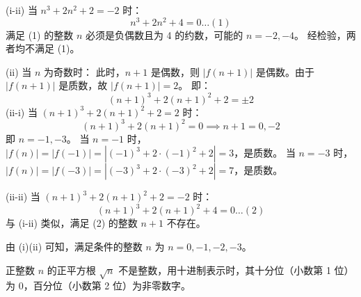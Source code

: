 \begin{questions}
\begin{solution}
    (i-ii) 当 $n^3 + 2n^2 + 2 = -2$ 时：
    \[
    n^3 + 2n^2 + 4 = 0 \dots (1)
    \]
    满足 (1) 的整数 $n$ 必须是负偶数且为 4 的约数，可能的 $n = -2, -4$。
    经检验，两者均不满足 (1)。

    (ii) 当 $n$ 为奇数时：
    此时，$n+1$ 是偶数，则 $|f(n+1)|$ 是偶数。由于 $|f(n+1)|$ 是质数，故 $|f(n+1)| = 2$。
    即：
    \[
    (n+1)^3 + 2(n+1)^2 + 2 = \pm 2
    \]
    (ii-i) 当 $(n+1)^3 + 2(n+1)^2 + 2 = 2$ 时：
    \[
    (n+1)^3 + 2(n+1)^2 = 0 \implies n+1 = 0, -2
    \]
    即 $n = -1, -3$。
    当 $n = -1$ 时，$|f(n)| = |f(-1)| = |(-1)^3 + 2 \cdot (-1)^2 + 2| = 3$，是质数。
    当 $n = -3$ 时，$|f(n)| = |f(-3)| = |(-3)^3 + 2 \cdot (-3)^2 + 2| = 7$，是质数。

    (ii-ii) 当 $(n+1)^3 + 2(n+1)^2 + 2 = -2$ 时：
    \[
    (n+1)^3 + 2(n+1)^2 + 4 = 0 \dots (2)
    \]
    与 (i-ii) 类似，满足 (2) 的整数 $n+1$ 不存在。

    由 (i)(ii) 可知，满足条件的整数 $n$ 为 $n = 0, -1, -2, -3$。
\end{solution}

\question 
正整数 $n$ 的正平方根 $\sqrt{n}$ 不是整数，用十进制表示时，其十分位（小数第 1 位）为 0，百分位（小数第 2 位）为非零数字。
\end{questions}
